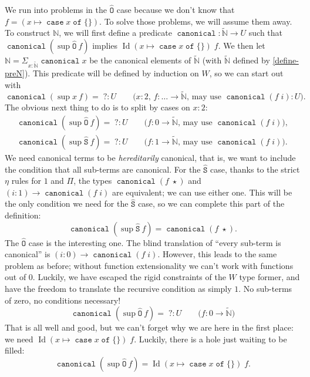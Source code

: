 \documentclass[a4paper,UKenglish,cleveref,nameinlink,autoref,thm-restate]{lipics-v2019}
\newcommand{\zero}{0}
\newcommand{\one}{1}
\newcommand{\bool}{2}
\newcommand{\codeO}{\mathtt{\hat{O}}}
\newcommand{\codeS}{\mathtt{\hat{S}}}
\DeclareMathOperator{\supop}{sup}
\renewcommand{\sup}[2]{\supop {#1}\:\!{#2}}
\newcommand{\N}{\hyperref[define-N]{\mathbb{N}}}
\newcommand{\preN}{\hyperref[define-preN]{\tilde{\mathbb{N}}}}
\DeclareMathOperator{\case}{\mathtt{case}}
\newcommand{\caset}[2]{\case {#1}\;\mathtt{of}\;\{{#2}\}}
\DeclareMathOperator{\Idop}{\mathrm{Id}}
\newcommand{\Id}[2]{\Idop {#1}\;{#2}}
\DeclareMathOperator{\canonical}{\hyperref[define-canonical]{\mathtt{canonical}}}
\begin{document}
We run into problems in the $\codeO$ case because we don't know that $f = (x\mapsto\caset{x}{})$.
To solve those problems, we will assume them away.
To construct $\N$, we will first define a predicate $\canonical : \preN \to U$ such that $\canonical(\sup{\codeO}{f})$ implies $\Id{(x\mapsto\caset{x}{})}{f}$.
We then let $\N = \Sigma_{x : \preN}\canonical x$ be the canonical elements of $\preN$ (with $\preN$ defined by \cref{define-preN}).
This predicate will be defined by induction on $W$, so we can start out with \[\canonical (\sup{x}{f}) =\; ? : U\qquad\text{($x : \bool$, $f : \dots \to \preN$, may use $\canonical (f\; i) : U$)}.\]
The obvious next thing to do is to split by cases on $x : \bool$:
\begin{gather*}
\canonical (\sup{\codeO}{f}) =\; ? : U\qquad\text{($f : \zero \to \preN$, may use $\canonical(f\;i)$)},\\
\canonical (\sup{\codeS}{f}) =\; ? : U\qquad\text{($f : \one \to \preN$, may use $\canonical(f\;i)$)}.
\end{gather*}
We need canonical terms to be \emph{hereditarily} canonical, that is, we want to include the condition that all sub-terms are canonical.
For the $\codeS$ case, thanks to the strict $\eta$ rules for $\one$ and $\Pi$, the types $\canonical(f\;\star)$ and $(i : \one) \to \canonical(f\;i)$ are equivalent; we can use either one.
This will be the only condition we need for the $\codeS$ case, so we can complete this part of the definition:
\[\canonical (\sup{\codeS}{f}) =\canonical(f\;\star).\]
The $\codeO$ case is the interesting one.
The blind translation of ``every sub-term is canonical'' is $(i : \zero) \to \canonical(f\;i)$.
However, this leads to the same problem as before; without function extensionality we can't work with functions out of $\zero$.
Luckily, we have escaped the rigid constraints of the $W$ type former, and have the freedom to translate the recursive condition as simply $\one$.
No sub-terms of zero, no conditions necessary!
\[\canonical (\sup{\codeO}{f}) =\; ? : U\qquad\text{($f : \zero \to \preN$)}\]
That is all well and good, but we can't forget why we are here in the first place: we need $\Id{(x\mapsto\caset{x}{})}{f}$.
Luckily, there is a hole just waiting to be filled:
\[\canonical (\sup{\codeO}{f}) = \Id{(x\mapsto\caset{x}{})}{f}.\]
\end{document}
